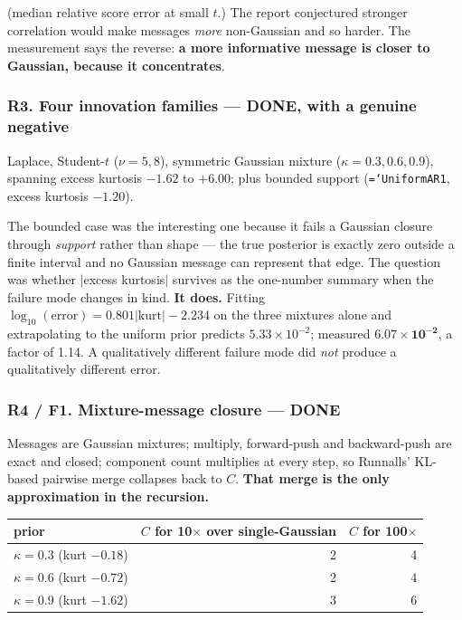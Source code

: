 \documentclass[11pt,a4paper]{article}
\newcommand{\done}{\textcolor{GoodGreen}{\textbf{DONE}}}
\newcommand{\code}[1]{\texttt{\small\hyphenchar\font=`\-\relax #1}}
\begin{document}
\noindent
(median relative score error at small $t$.) The report conjectured stronger correlation
would make messages \emph{more} non-Gaussian and so harder. The measurement says the
reverse: \textbf{a more informative message is closer to Gaussian, because it concentrates}.

\subsubsection*{R3. Four innovation families --- \done, with a genuine negative}

Laplace, Student-$t$ ($\nu=5,8$), symmetric Gaussian mixture ($\kappa=0.3,0.6,0.9$),
spanning excess kurtosis $-1.62$ to $+6.00$; plus bounded support (\code{UniformAR1},
excess kurtosis $-1.20$).

The bounded case was the interesting one because it fails a Gaussian closure through
\emph{support} rather than shape --- the true posterior is exactly zero outside a finite
interval and no Gaussian message can represent that edge. The question was whether
$|$excess kurtosis$|$ survives as the one-number summary when the failure mode changes in
kind. \textbf{It does.} Fitting
$\log_{10}(\text{error}) = 0.801|\text{kurt}| - 2.234$ on the three mixtures alone and
extrapolating to the uniform prior predicts $5.33\times10^{-2}$; measured
$\mathbf{6.07\times10^{-2}}$, a factor of 1.14. A qualitatively different failure mode did
\emph{not} produce a qualitatively different error.

\subsubsection*{R4 / F1. Mixture-message closure --- \done}

Messages are Gaussian mixtures; multiply, forward-push and backward-push are exact and
closed; component count multiplies at every step, so Runnalls' KL-based pairwise merge
collapses back to $C$. \textbf{That merge is the only approximation in the recursion.}

\begin{center}
\begin{tabular}{@{}lrr@{}}
\toprule
prior & $C$ for 10$\times$ over single-Gaussian & $C$ for 100$\times$ \\
\midrule
$\kappa=0.3$ (kurt $-0.18$) & 2 & 4 \\
$\kappa=0.6$ (kurt $-0.72$) & 2 & 4 \\
$\kappa=0.9$ (kurt $-1.62$) & 3 & 6 \\
\bottomrule
\end{tabular}
\end{center}
\end{document}
